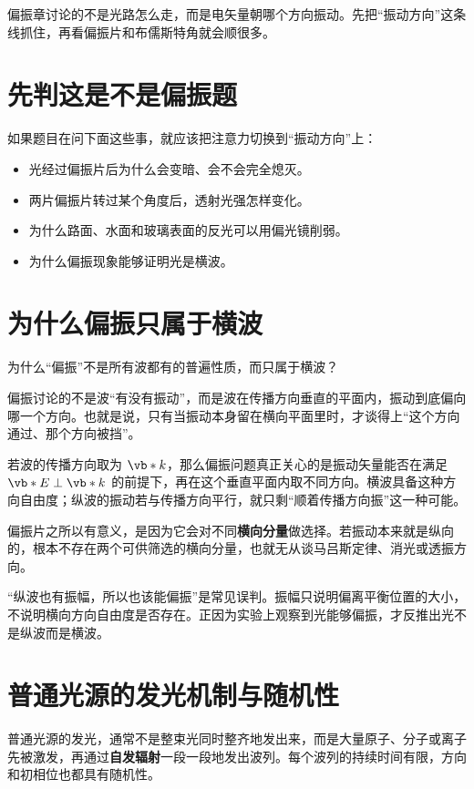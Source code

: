 \documentclass[lang=cn,11pt]{elegantbook}
\newcommand{\bridge}[1]{\begin{note}#1\end{note}}
\begin{document}
\bridge{偏振章讨论的不是光路怎么走，而是电矢量朝哪个方向振动。先把“振动方向”这条线抓住，再看偏振片和布儒斯特角就会顺很多。}

\section{先判这是不是偏振题}

如果题目在问下面这些事，就应该把注意力切换到“振动方向”上：
\begin{itemize}
 \item 光经过偏振片后为什么会变暗、会不会完全熄灭。
 \item 两片偏振片转过某个角度后，透射光强怎样变化。
 \item 为什么路面、水面和玻璃表面的反光可以用偏光镜削弱。
 \item 为什么偏振现象能够证明光是横波。
\end{itemize}

\section{为什么偏振只属于横波}

 为什么“偏振”不是所有波都有的普遍性质，而只属于横波？

 偏振讨论的不是波“有没有振动”，而是波在传播方向垂直的平面内，振动到底偏向哪一个方向。也就是说，只有当振动本身留在横向平面里时，才谈得上“这个方向通过、那个方向被挡”。

 若波的传播方向取为 \(\vb*{k}\)，那么偏振问题真正关心的是振动矢量能否在满足
 \(\vb*{E}\perp \vb*{k}\) 
的前提下，再在这个垂直平面内取不同方向。横波具备这种方向自由度；纵波的振动若与传播方向平行，就只剩“顺着传播方向振”这一种可能。

 偏振片之所以有意义，是因为它会对不同\textbf{横向分量}做选择。若振动本来就是纵向的，根本不存在两个可供筛选的横向分量，也就无从谈马吕斯定律、消光或透振方向。

 “纵波也有振幅，所以也该能偏振”是常见误判。振幅只说明偏离平衡位置的大小，不说明横向方向自由度是否存在。正因为实验上观察到光能够偏振，才反推出光不是纵波而是横波。

\section{普通光源的发光机制与随机性}

普通光源的发光，通常不是整束光同时整齐地发出来，而是大量原子、分子或离子先被激发，再通过\textbf{自发辐射}一段一段地发出波列。每个波列的持续时间有限，方向和初相位也都具有随机性。
\end{document}
